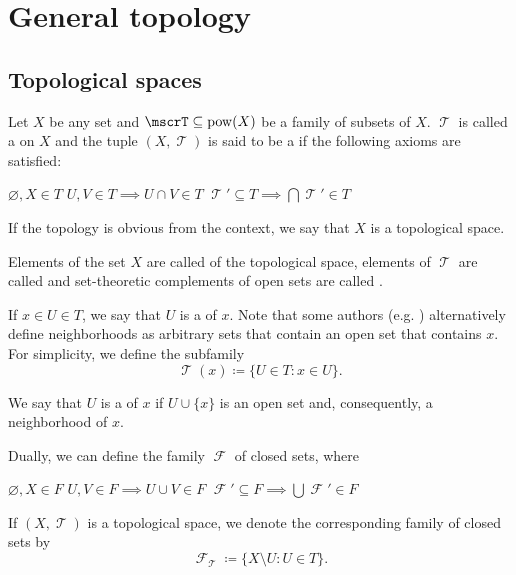 \section{General topology}\label{sec:general_topology}
\subsection{Topological spaces}\label{subsec:topological_spaces}

\begin{definition}\label{def:topological_space}
  Let \( X \) be any set and \( \mscrT \subseteq \pow(X) \) be a family of subsets of \( X \). \( \mscrT \) is called a  on \( X \) and the tuple \( (X, \mscrT) \) is said to be a  if the following axioms are satisfied:
  \begin{thmenum}
     \( \varnothing, X \in T \)
     \( U, V \in T \implies U \cap V \in T \)
     \( \mscrT' \subseteq T \implies \bigcap \mscrT' \in T \)
  \end{thmenum}

  If the topology is obvious from the context, we say that \( X \) is a topological space.

  Elements of the set \( X \) are called  of the topological space, elements of \( \mscrT \) are called  and set-theoretic complements of open sets are called .

  If \( x \in U \in T \), we say that \( U \) is a  of \( x \). Note that some authors (e.g. \cite[38]{Kelley1955}) alternatively define neighborhoods as arbitrary sets that contain an open set that contains \( x \). For simplicity, we define the subfamily
  \begin{equation*}
    \mscrT(x) \coloneqq \{ U \in T \colon x \in U \}.
  \end{equation*}

  We say that \( U \) is a  of \( x \) if \( U \cup \{ x \} \) is an open set and, consequently, a neighborhood of \( x \).

  Dually, we can define the family \( \mscrF \) of closed sets, where
  \begin{thmenum}
     \( \varnothing, X \in F \)
     \( U, V \in F \implies U \cup V \in F \)
     \( \mscrF' \subseteq F \implies \bigcup \mscrF' \in F \)
  \end{thmenum}

  If \( (X, \mscrT) \) is a topological space, we denote the corresponding family of closed sets by
  \begin{equation*}
    \mscrF_\mscrT \coloneqq \{ X \setminus U \colon U \in T \}.
  \end{equation*}
\end{definition}

